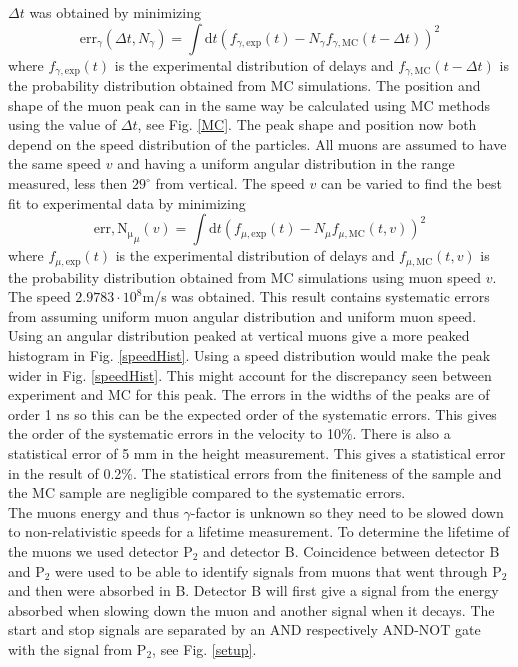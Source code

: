 \documentclass[10pt,twocolumn]{article}
\begin{document}
$\Delta t$ was obtained by minimizing
\begin{equation}
 \mathrm{err}_\gamma(\Delta t, N_\gamma)=\int\mathrm{d}t\left(f_{\gamma,\mathrm{exp}}(t)-N_\gamma f_{\gamma,\mathrm{MC}}(t-\Delta t)\right)^2
\end{equation}
where $f_{\gamma,\mathrm{exp}}(t)$ is the experimental distribution of delays and $f_{\gamma,\mathrm{MC}}(t-\Delta t)$ is the probability distribution obtained from MC simulations. The position and shape of the muon peak can in the same way be calculated using MC methods using the value of $\Delta t$, see Fig. \ref{MC}. The peak shape and position now both depend on the speed distribution of the particles. All muons are assumed to have the same speed $v$ and having a uniform angular distribution in the range measured, less then $29^\circ$ from vertical. The speed $v$ can be varied to find the best fit to experimental data by minimizing
\begin{equation}
 \mathrm{err,N_\mu}_\mu(v)=\int\mathrm{d}t\left(f_{\mu,\mathrm{exp}}(t)-N_\mu f_{\mu,\mathrm{MC}}(t,v)\right)^2
\end{equation}
where $f_{\mu,\mathrm{exp}}(t)$ is the experimental distribution of delays and $f_{\mu,\mathrm{MC}}(t,v)$ is the probability distribution obtained from MC simulations using muon speed $v$. The speed $2.9783\cdot10^8$m/s was obtained. This result contains systematic errors from assuming uniform muon angular distribution and uniform muon speed. Using an angular distribution peaked at vertical muons give a more peaked histogram in Fig. \ref{speedHist}. Using a speed distribution would make the peak wider in Fig. \ref{speedHist}. This might account for the discrepancy seen between experiment and MC for this peak. The errors in the widths of the peaks are of order 1 ns so this can be the expected order of the systematic errors. This gives the order of the systematic errors in the velocity to 10\%. There is also a statistical error of 5 mm in the height measurement. This gives a statistical error in the result of 0.2\%. The statistical errors from the finiteness of the sample and the MC sample are negligible compared to the systematic errors.\\

The muons energy and thus $\gamma$-factor is unknown so they need to be slowed down to non-relativistic speeds for a lifetime measurement. To determine the lifetime of the muons we used detector P$_2$ and detector B. Coincidence between detector B and P$_2$ were used to be able to identify signals from muons that went through P$_2$ and then were absorbed in B. Detector B will first give a signal from the energy absorbed when slowing down the muon and another signal when it decays. The start and stop signals are separated by an AND respectively AND-NOT gate with the signal from P$_2$, see Fig. \ref{setup}.\\
\end{document}
